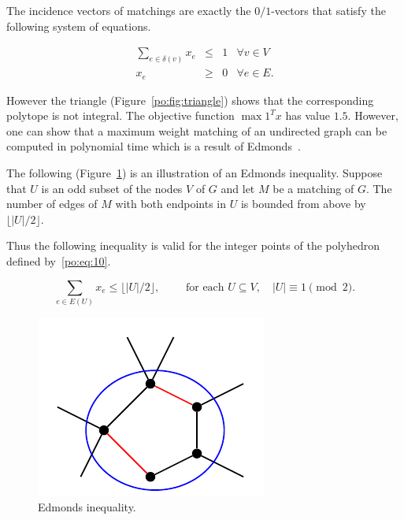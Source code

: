 The incidence vectors of matchings are exactly the $0/1$-vectors that
satisfy the following system of equations. 

\begin{equation}
\label{po:eq:10}
  \begin{array}{rcll}
     \sum_{e \in \delta(v)} x_e & \leq &  1 & \forall v \in V\\
        x_e& \geq & 0 &    \forall e \in E. 
  \end{array}
\end{equation}

However the triangle (Figure~\ref{po:fig:triangle}) shows that  the
corresponding polytope is not integral. The objective function $\max
\mathrm{1}^Tx$ has value $1.5$. However, one can show that a maximum
weight matching of an undirected graph can be computed in polynomial
time which is a result of Edmonds~\cite{Edmonds65}. 


The following (Figure~\ref{po:fig:edmonds}) is an illustration of an
Edmonds inequality. Suppose that $U$ is an odd subset of the nodes $V$
of $G$ and let $M$ be a matching of $G$. The number of edges of $M$
with both endpoints in $U$ is bounded from above by $\lfloor|U|/2\rfloor$. 

Thus the following inequality is valid for the integer points of the
polyhedron defined by~\eqref{po:eq:10}. 

\begin{equation}
  \label{po:eq:11}
  \sum_{e \in E(U)} x_e \leq\lfloor|U|/2\rfloor,\quad \quad \text{ for each } U\subseteq V,
  \quad |U| \equiv 1 \pmod{2}. 
\end{equation}


\begin{figure}[htbp]    
  \begin{center}
   \includegraphics{figures/IntProg4.pdf}
\end{center}
\caption{Edmonds inequality.}
  \label{po:fig:edmonds}
\end{figure}


